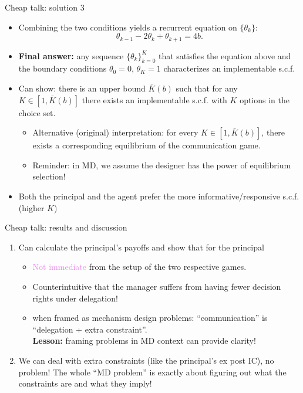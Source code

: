 \documentclass[english,10pt
,aspectratio=169
]{beamer}
\begin{document}
\begin{frame}{Cheap talk: solution 3}
	\begin{itemize}
		\item Combining the two conditions yields a recurrent equation on $\{\theta_k\}$: $$\theta_{k-1}-2\theta_k + \theta_{k+1} = 4b.$$
		
		\item \textbf{Final answer:} any sequence $\{\theta_k\}_{k=0}^K$ that satisfies the equation above and the boundary conditions $\theta_0 = 0$, $\theta_K = 1$ characterizes an implementable s.c.f.
		
		\item Can show: there is an upper bound $\bar{K}(b)$ such that for any $K \in [1, \bar{K}(b)]$ there exists an implementable s.c.f. with $K$ options in the choice set. 
		\begin{itemize}
			\item Alternative (original) interpretation: for every $K \in [1, \bar{K}(b)]$, there exists a corresponding equilibrium of the communication game. 
			\item Reminder: in MD, we assume the designer has the power of equilibrium selection!
		\end{itemize}
		
		\item Both the principal and the agent prefer the more informative/responsive s.c.f. (higher $K$)
	\end{itemize}
\end{frame}


\begin{frame}{Cheap talk: results and discussion}
	\begin{enumerate}
		\item Can calculate the principal's payoffs and show that  for the principal
		\begin{itemize}
			\item \textcolor{violet}{Not immediate} from the setup of the two respective games.
			\item \alert{Counterintuitive} that the manager suffers from having fewer decision rights under delegation!
			\item {} when framed as mechanism design problems: ``communication'' is ``delegation + extra constraint''. \\
			\textbf{Lesson:} framing problems in MD context can provide clarity!
		\end{itemize}
		
		\item We can deal with extra constraints (like the principal's ex post IC), no problem! The whole ``MD problem'' is exactly about figuring out what the constraints are and what they imply!
	\end{enumerate}
\end{frame}
\end{document}
